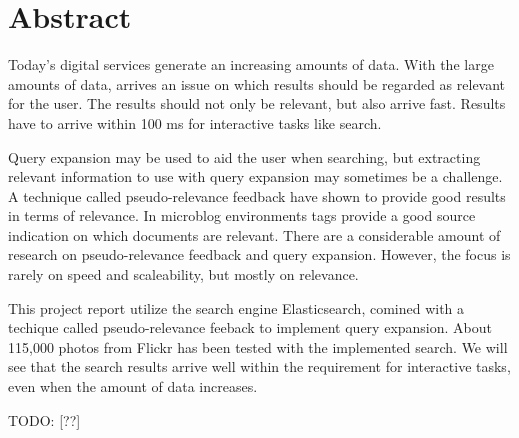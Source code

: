 \chapter*{Abstract}
Today's digital services generate an increasing amounts of data.
With the large amounts of data, arrives an issue on which results should be regarded as relevant for the user.
The results should not only be relevant, but also arrive fast.
Results have to arrive within 100 ms for interactive tasks like search.

Query expansion may be used to aid the user when searching,
but extracting relevant information to use with query expansion may sometimes be a challenge.
A technique called pseudo-relevance feedback have shown to provide good results in terms of relevance.
In microblog environments tags provide a good source indication on which documents are relevant.
There are a considerable amount of research on pseudo-relevance feedback and query expansion.
However, the focus is rarely on speed and scaleability, but mostly on relevance.

This project report utilize the search engine Elasticsearch,
comined with a techique called pseudo-relevance feeback to implement query expansion.
About 115,000 photos from Flickr has been tested with the implemented search.
We will see that the search results arrive well within the requirement for interactive tasks,
even when the amount of data increases.

TODO: [??]

